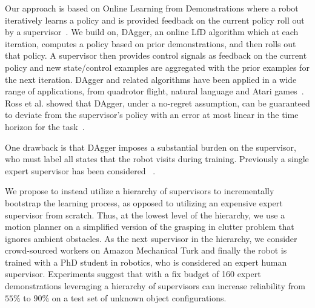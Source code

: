 \documentclass[10pt, conference]{ieeeconf}      %
\newcommand{\mlnote}[1]{\ifthenelse{ \boolean{include-notes}}%
 {\textcolor{purple}{\textbf{ML: #1}}}{}}
\begin{document}
Our approach is based on Online Learning from Demonstrations where a robot iteratively learns a policy and is
provided feedback on the current policy roll out by a supervisor~\cite{grollman2007dogged,ross2010efficient,ross2010reduction}. 
We build on, DAgger, an online LfD algorithm which at each iteration, computes a policy based on prior demonstrations,
and then rolls out that policy. A supervisor then provides control signals as feedback on the current policy
and new state/control examples are aggregated with the prior examples for the next iteration. DAgger and related algorithms have been applied in a wide range of applications, from quadrotor flight, natural language and Atari games~\cite{NIPS2014_5421,duvallet2013imitation,ross2013learning}. 
Ross et al. showed that DAgger, under a no-regret assumption, can be guaranteed to deviate from the supervisor's policy with an error
at most linear in the time horizon for the task~\cite{ross2010reduction}.

One drawback is that DAgger imposes a substantial burden on the supervisor, who must label all states that the robot
visits during training.  Previously a single expert supervisor has been considered 
~\cite{ross2010efficient,laskeyshiv,ross2010reduction,ross2013learning,duvallet2013imitation}.


We  propose to instead
utilize a hierarchy of supervisors  to incrementally
bootstrap the learning process, as opposed to utilizing an expensive
expert supervisor from scratch. Thus, at the lowest level of the hierarchy, we use a motion planner on a simplified
version of the grasping in clutter problem that ignores ambient obstacles. As the next supervisor in the hierarchy, 
we consider crowd-sourced workers on Amazon Mechanical Turk and finally the robot is trained with a PhD student in
robotics, who is considered an expert human supervisor. Experiments suggest that with a fix budget of 160 expert demonstrations leveraging a hierarchy of supervisors can increase reliability from $55\%$ to $90\%$ on a test set of unknown object configurations. 

\end{document}
